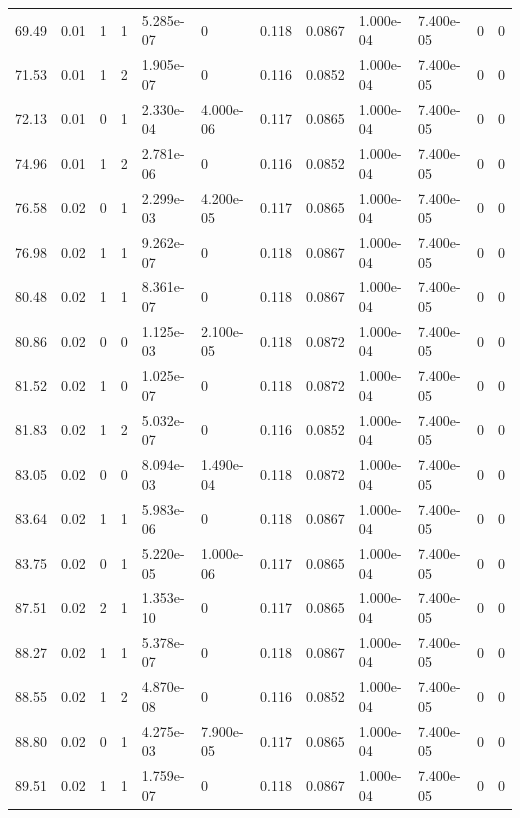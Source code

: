 \documentclass[preview]{standalone}
\begin{document}
{{{\begin{tabular}{L{1.2cm}C{1.2cm} C{0.3cm}C{0.5cm} C{1.4cm}C{1.4cm} C{1.4cm}C{1.4cm} C{1.6cm}C{1.6cm} C{1.6cm}C{1.6cm}}
  69.49  &  0.01  & 1     &  1 &  5.285e-07  & 0  &  0.118&   0.0867& 1.000e-04 & 7.400e-05   &  0 & 0  \\ 
  71.53  &  0.01  & 1     &  2 &  1.905e-07  & 0  &  0.116&   0.0852& 1.000e-04 & 7.400e-05   &  0 & 0  \\ 
  72.13  &  0.01  & 0     &  1 &  2.330e-04  & 4.000e-06  &  0.117&   0.0865& 1.000e-04 & 7.400e-05   &  0 & 0  \\ 
  74.96  &  0.01  & 1     &  2 &  2.781e-06  & 0  &  0.116&   0.0852& 1.000e-04 & 7.400e-05   &  0 & 0  \\ 
  76.58  &  0.02  & 0     &  1 &  2.299e-03  & 4.200e-05  &  0.117&   0.0865& 1.000e-04 & 7.400e-05   &  0 & 0  \\ 
  76.98  &  0.02  & 1     &  1 &  9.262e-07  & 0  &  0.118&   0.0867& 1.000e-04 & 7.400e-05   &  0 & 0  \\ 
  80.48  &  0.02  & 1     &  1 &  8.361e-07  & 0  &  0.118&   0.0867& 1.000e-04 & 7.400e-05   &  0 & 0  \\ 
  80.86  &  0.02  & 0     &  0 &  1.125e-03  & 2.100e-05  &  0.118&   0.0872& 1.000e-04 & 7.400e-05   &  0 & 0  \\ 
  81.52  &  0.02  & 1     &  0 &  1.025e-07  & 0  &  0.118&   0.0872& 1.000e-04 & 7.400e-05   &  0 & 0  \\ 
  81.83  &  0.02  & 1     &  2 &  5.032e-07  & 0  &  0.116&   0.0852& 1.000e-04 & 7.400e-05   &  0 & 0  \\ 
  83.05  &  0.02  & 0     &  0 &  8.094e-03  & 1.490e-04  &  0.118&   0.0872& 1.000e-04 & 7.400e-05   &  0 & 0  \\ 
  83.64  &  0.02  & 1     &  1 &  5.983e-06  & 0  &  0.118&   0.0867& 1.000e-04 & 7.400e-05   &  0 & 0  \\ 
  83.75  &  0.02  & 0     &  1 &  5.220e-05  & 1.000e-06  &  0.117&   0.0865& 1.000e-04 & 7.400e-05   &  0 & 0  \\ 
  87.51  &  0.02  & 2     &  1 &  1.353e-10  & 0  &  0.117&   0.0865& 1.000e-04 & 7.400e-05   &  0 & 0  \\ 
  88.27  &  0.02  & 1     &  1 &  5.378e-07  & 0  &  0.118&   0.0867& 1.000e-04 & 7.400e-05   &  0 & 0  \\ 
  88.55  &  0.02  & 1     &  2 &  4.870e-08  & 0  &  0.116&   0.0852& 1.000e-04 & 7.400e-05   &  0 & 0  \\ 
  88.80  &  0.02  & 0     &  1 &  4.275e-03  & 7.900e-05  &  0.117&   0.0865& 1.000e-04 & 7.400e-05   &  0 & 0  \\ 
  89.51  &  0.02  & 1     &  1 &  1.759e-07  & 0  &  0.118&   0.0867& 1.000e-04 & 7.400e-05   &  0 & 0  \\ 

\end{tabular}}}}
\end{document}
